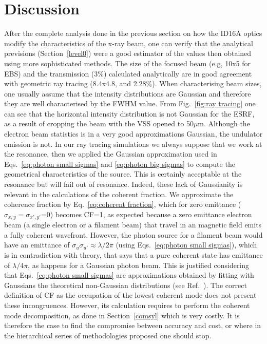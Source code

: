 \documentclass{iucr}              %
\newcommand{\todo}[1]{{\color{red}[TODO: "#1'']}}
\begin{document}
 

\section{Discussion} 
\label{discussion}

After the complete analysis done in the previous section on how the ID16A optics modify the characteristics of the x-ray beam, one can verify that the analytical previsions (Section~\ref{level0}) were a good estimator of the values then obtained using more sophisticated methods. The size of the focused beam (e.g, 10x5 for EBS) and the transmission (3\%) calculated analytically are in good agreement with geometric ray tracing (8.4x4.8, and 2.28\%). When characterising beam sizes, one usually assume that the intensity distributions are Gaussian and therefore they are well characterised by the FWHM value. From Fig.~\ref{fig:ray tracing} one can see that the horizontal intensity distribution is not Gaussian for the ESRF, as a result of cropping the beam with the VSS opened to 50$\mu$m. Although the electron beam statistics is in a very good approximations Gaussian, the undulator emission is not. In our ray tracing simulations we always suppose that we work at the resonance, then we applied the Gaussian approximation used in Eqs.~\ref{eq:photon small sigmas} and \ref{eq:photon big sigmas} to compute the geometrical characteristics of the source. This is certainly acceptable at the resonance but will fail out of resonance. Indeed, these lack of Gaussianity is relevant in the calculations of the coherent fraction. We approximate the coherence fraction by Eq.~\ref{eq:coherent fraction}, which for zero emittance ($\sigma_{x,y}=\sigma_{x',y'}$=0) becomes CF=1, as expected because a zero emittance electron beam (a single electron or a filament beam) that travel in an magnetic field emits a fully coherent wavefront. However, the photon source for a filament beam would have an emittance of $\sigma_u \sigma_{u'} \approx \lambda / 2 \pi$ (using Eqs.~\ref{eq:photon small sigmas}), which is in contradiction with theory, that says that a pure coherent state has emittance of $\lambda / 4 \pi$, as happens for a Gaussian photon beam. This is justified considering that Eqs.~\ref{eq:photon small sigmas} are approximations obtained by fitting with Gaussians the theoretical non-Gaussian distributions (see Ref.~\cite{elleaume}). The correct definition of CF as the occupation of the lowest coherent mode does not present these incongruences. However, its calculation requires to perform the coherent mode decomposition, as done in Section~\ref{comsyl} which is very costly. It is therefore the case to find the compromise between accuracy and cost, or where in the hierarchical series of methodologies proposed one should stop. 
\end{document}
